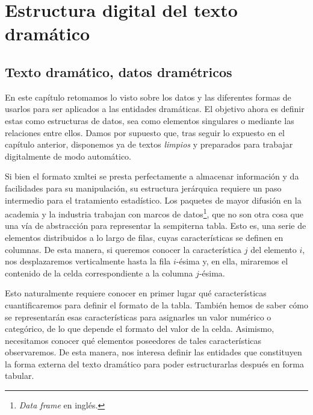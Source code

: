 \chapter{Estructura digital del texto dramático}\label{chap:B2}
\section{Texto dramático, datos dramétricos}
En este capítulo retomamos lo visto sobre los datos y las diferentes formas de usarlos para ser aplicados a las entidades dramáticas. El objetivo ahora es definir estas como estructuras de datos, sea como elementos singulares o mediante las relaciones entre ellos. Damos por supuesto que, tras seguir lo expuesto en el capítulo anterior, disponemos ya de textos \textit{limpios} y preparados para trabajar digitalmente de modo automático.

Si bien el formato \ac{xmltei} se presta perfectamente a almacenar información y da facilidades para su manipulación, su estructura jerárquica requiere un paso intermedio para el tratamiento estadístico. Los paquetes de mayor difusión en la academia y la industria trabajan con marcos de datos\footnote{{\textit{Data frame}} en inglés.}, que no son otra cosa que una vía de abstracción para representar la sempiterna tabla. Esto es, una serie de elementos distribuidos a lo largo de filas, cuyas características se definen en columnas. De esta manera, si queremos conocer la característica $j$ del elemento $i$, nos desplazaremos verticalmente hasta la fila $i$-ésima y, en ella, miraremos el contenido de la celda correspondiente a la columna $j$-ésima.

Esto naturalmente requiere conocer en primer lugar qué características cuantificaremos para definir el formato de la tabla. También hemos de saber cómo se representarán esas características para asignarles un valor numérico o categórico, de lo que depende el formato del valor de la celda. Asimismo, necesitamos conocer qué elementos poseedores de tales características observaremos. De esta manera, nos interesa definir las entidades que constituyen la forma externa del texto dramático para poder estructurarlas después en forma tabular.

